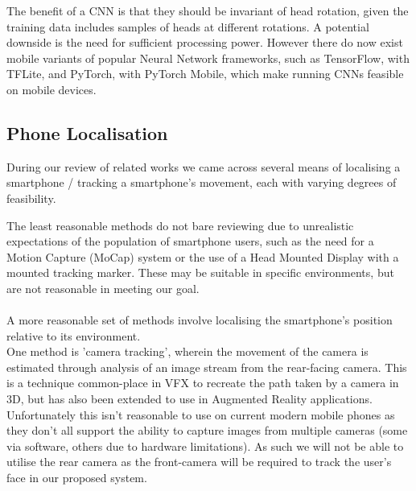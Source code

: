 The benefit of a CNN is that they should be invariant of head rotation, given the training data includes samples of heads at different rotations.
A potential downside is the need for sufficient processing power. However there do now exist mobile variants of popular Neural Network frameworks, such as TensorFlow, with TFLite, and PyTorch, with PyTorch Mobile, which make running CNNs feasible on mobile devices.



\subsection{Phone Localisation}
During our review of related works we came across several means of localising a smartphone / tracking a smartphone's movement, each with varying degrees of feasibility.

The least reasonable methods do not bare reviewing due to unrealistic expectations of the population of smartphone users, such as the need for a Motion Capture (MoCap) system\cite{buschel2017investigating} or the use of a Head Mounted Display with a mounted tracking marker\cite{mohr2019trackcap}.
These may be suitable in specific environments, but are not reasonable in meeting our goal.
\\\\
A more reasonable set of methods involve localising the smartphone's position relative to its environment.
\\
One method is 'camera tracking', wherein the movement of the camera is estimated through analysis of an image stream from the rear-facing camera. This is a technique common-place in VFX to recreate the path taken by a camera in 3D\cite{barber2016camera}, but has also been extended to use in Augmented Reality applications\cite{jiang2000camera}.
Unfortunately this isn't reasonable to use on current modern mobile phones as they don't all support the ability to capture images from multiple cameras (some via software, others due to hardware limitations). As such we will not be able to utilise the rear camera as the front-camera will be required to track the user's face in our proposed system.

